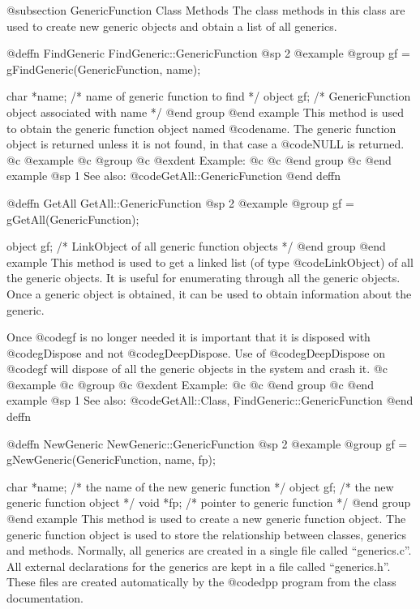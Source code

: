 @subsection GenericFunction Class Methods
The class methods in this class are used to create new generic objects
and obtain a list of all generics.





@deffn {FindGeneric} FindGeneric::GenericFunction
@sp 2
@example
@group
gf = gFindGeneric(GenericFunction, name);

char  *name;    /*  name of generic function to find  */
object  gf;     /*  GenericFunction object associated with name  */
@end group
@end example
This method is used to obtain the generic function object named @code{name}.
The generic function object is returned unless it is not found, in that case
a @code{NULL} is returned.
@c @example
@c @group
@c @exdent Example:
@c 
@c @end group
@c @end example
@sp 1
See also:  @code{GetAll::GenericFunction}
@end deffn





@deffn {GetAll} GetAll::GenericFunction
@sp 2
@example
@group
gf = gGetAll(GenericFunction);

object  gf;     /*  LinkObject of all generic function objects  */
@end group
@end example
This method is used to get a linked list (of type @code{LinkObject})
of all the generic objects.  It is useful for enumerating through
all the generic objects.  Once a generic object is obtained, it
can be used to obtain information about the generic.

Once @code{gf} is no longer needed it is important that it is
disposed with @code{gDispose} and not @code{gDeepDispose}.  Use
of @code{gDeepDispose} on @code{gf} will dispose of all the generic
objects in the system and crash it.
@c @example
@c @group
@c @exdent Example:
@c 
@c @end group
@c @end example
@sp 1
See also:  @code{GetAll::Class, FindGeneric::GenericFunction}
@end deffn







@deffn {NewGeneric} NewGeneric::GenericFunction
@sp 2
@example
@group
gf = gNewGeneric(GenericFunction, name, fp);

char    *name;  /*  the name of the new generic function */
object  gf;     /*  the new generic function object  */
void    *fp;    /*  pointer to generic function  */
@end group
@end example
This method is used to create a new generic function object.
The generic function object is used to store the relationship between
classes, generics and methods.  Normally, all generics are created
in a single file called ``generics.c''.  All external declarations for
the generics are kept in a file called ``generics.h''.  These files
are created automatically by the @code{dpp} program from the
class documentation.

